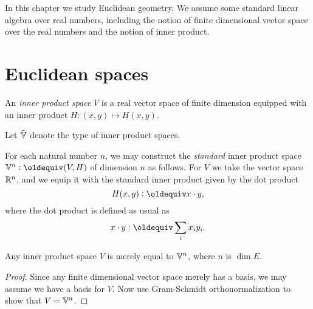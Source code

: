

In this chapter we study Euclidean geometry.  We assume some standard linear
algebra over real numbers, including the notion of finite dimensional vector
space over the real numbers and the notion of inner product.

\section{Euclidean spaces}

\begin{definition}\label{def:InnerProductSpace}
  An {\em inner product space} $V$ is a real vector space of finite dimension
  equipped with an inner product $H : (x,y) \mapsto H( x,y )$.
\end{definition}

Let ${\tilde {\mathbb V}}$ denote the type of inner product spaces.

For each natural number $n$, we may construct the {\em standard} inner product
space $\VV^n \defeq (V,H)$ of dimension $n$ as follows.  For $V$ we take the
vector space $\mathbb{R}^n$, and we equip it with the standard inner product given by
the dot product
$$ H ( x , y) \defeq x \cdot y, $$
where the dot product is defined as usual as
$$ x \cdot y \defeq \sum_i x_i y_i . $$

\begin{theorem}\label{thm:GramSchmidt}
  Any inner product space $V$ is merely equal to $\mathbb V^n$, where $n$ is $\dim E$.
\end{theorem}

\begin{proof}
  Since any finite dimensional vector space merely has a basis, we may assume
  we have a basis for $V$.  Now use Gram-Schmidt orthonormalization to show
  that $V = \mathbb V^n$.
\end{proof}

